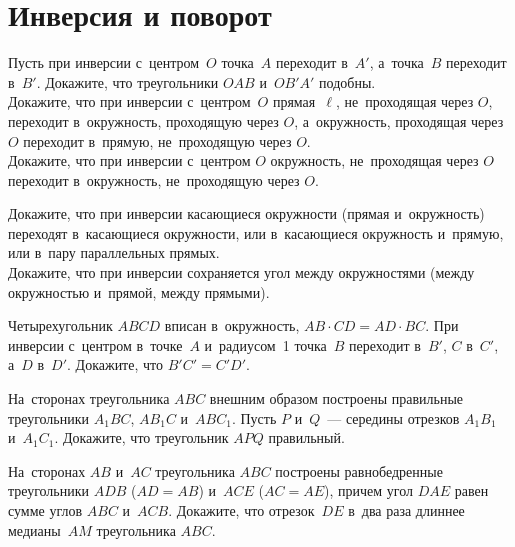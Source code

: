 
\section*{Инверсия и поворот}


\begin{problems}

\item
\subproblem
Пусть при инверсии с~центром~$O$ точка~$A$ переходит в~$A'$, а~точка~$B$
переходит в~$B'$.
Докажите, что треугольники $OAB$ и~$OB'A'$ подобны.
\\
\subproblem
Докажите, что при инверсии с~центром~$O$ прямая~$\ell$, не~проходящая
через $O$, переходит в~окружность, проходящую через $O$, а~окружность,
проходящая через $O$ переходит в~прямую, не~проходящую через $O$.
\\
\subproblem
Докажите, что при инверсии с~центром $O$ окружность, не~проходящая через
$O$ переходит в~окружность, не~проходящую через $O$.

\item
\subproblem
Докажите, что при инверсии касающиеся окружности (прямая и~окружность)
переходят в~касающиеся окружности, или в~касающиеся окружность и~прямую,
или в~пару параллельных прямых.
\\
\subproblem
Докажите, что при инверсии сохраняется угол между окружностями (между
окружностью и~прямой, между прямыми).

\item
Четырехугольник $ABCD$ вписан в~окружность, $AB \cdot CD = AD \cdot BC$.
При инверсии с~центром в~точке~$A$ и~радиусом~1
точка~$B$ переходит в~$B'$, $C$ в~$C'$, а~$D$ в~$D'$.
Докажите, что $B'C' = C'D'$.

\item
На~сторонах треугольника $ABC$ внешним образом построены правильные
треугольники $A_1 B C$, $A B_1 C$ и~$A B C_1$.
Пусть $P$ и~$Q$~--- середины отрезков $A_1 B_1$ и~$A_1 C_1$.
Докажите, что треугольник $APQ$ правильный.

\item
На~сторонах $AB$ и~$AC$ треугольника $ABC$ построены равнобедренные
треугольники $ADB$ ($AD = AB$) и~$ACE$ ($AC = AE$), причем угол $DAE$ равен
сумме углов $ABC$ и~$ACB$.
Докажите, что отрезок~$DE$ в~два раза длиннее медианы~$AM$ треугольника $ABC$.


\end{problems}
